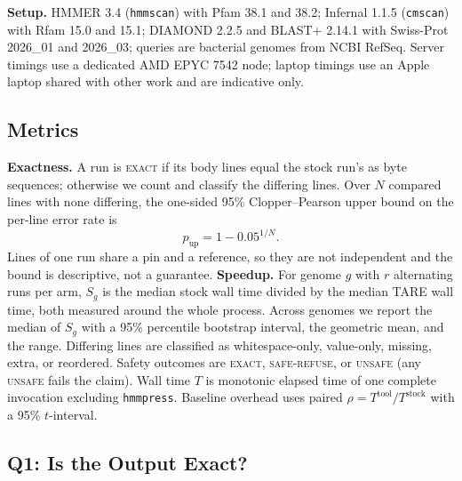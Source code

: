 \documentclass[letterpaper,twocolumn,10pt]{article}
\theoremstyle{definition}
\newcommand{\sys}{TARE\xspace}
\newcommand{\sys}{PARE\xspace}
\newcommand{\dec}[1]{\textsc{#1}}
\begin{document}
\textbf{Setup.} HMMER 3.4 (\texttt{hmmscan}) with Pfam 38.1 and 38.2; Infernal 1.1.5 (\texttt{cmscan}) with Rfam 15.0
and 15.1; DIAMOND 2.2.5 and BLAST+ 2.14.1 with Swiss\nobreakdash-Prot 2026\_01 and 2026\_03; queries are bacterial genomes from NCBI
RefSeq. Server timings use a dedicated AMD EPYC 7542 node; laptop timings use an Apple laptop shared with other work and
are indicative only.

\subsection{Metrics}
\label{sec:metrics}

\textbf{Exactness.} A run is \dec{exact} if its body lines equal the stock run's as byte sequences; otherwise we count
and classify the differing lines. Over $N$ compared lines with none differing, the one\nobreakdash-sided 95\% Clopper--Pearson upper
bound on the per\nobreakdash-line error rate is
\begin{equation}
p_{\text{up}} = 1 - 0.05^{1/N}.
\label{eq:cp}
\end{equation}
Lines of one run share a pin and a reference, so they are not independent and the bound is descriptive, not a guarantee.
\textbf{Speedup.} For genome $g$ with $r$ alternating runs per arm, $S_g$ is the median stock wall time divided by the
median \sys wall time, both measured around the whole process. Across genomes we report the median of $S_g$ with a 95\%
percentile bootstrap interval, the geometric mean, and the range. Differing lines are classified as whitespace\nobreakdash-only,
value\nobreakdash-only, missing, extra, or reordered. Safety outcomes are \dec{exact}, \dec{safe-refuse}, or \dec{unsafe}
(any \dec{unsafe} fails the claim). Wall time $T$ is monotonic elapsed time of one complete invocation excluding
\texttt{hmmpress}. Baseline overhead uses paired $\rho = T^{\text{tool}}/T^{\text{stock}}$ with a 95\% $t$-interval.

\subsection{Q1: Is the Output Exact?}
\label{sec:eval-exact}
\end{document}
